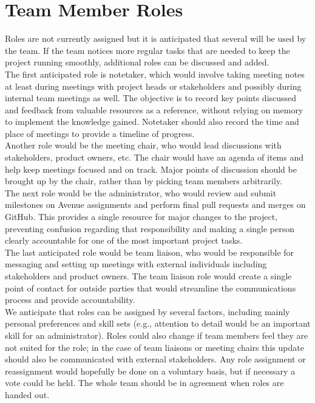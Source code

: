 \documentclass{article}
\begin{document}
\section{Team Member Roles}
Roles are not currently assigned but it is anticipated that several will be used by the team. If the team notices more regular tasks that are needed to keep the project running smoothly, additional roles can be discussed and added. \\
The first anticipated role is notetaker, which would involve taking meeting notes at least during meetings with project heads or stakeholders and possibly during internal team meetings as well. The objective is to record key points discussed and feedback from valuable resources as a reference, without relying on memory to implement the knowledge gained. Notetaker should also record the time and place of meetings to provide a timeline of progress.\\
Another role would be the meeting chair, who would lead discussions with stakeholders, product owners, etc. The chair would have an agenda of items and help keep meetings focused and on track. Major points of discussion should be brought up by the chair, rather than by picking team members arbitrarily.\\
The next role would be the administrator, who would review and submit milestones on Avenue assignments and perform final pull requests and merges on GitHub. This provides a single resource for major changes to the project, preventing confusion regarding that responsibility and making a single person clearly accountable for one of the most important project tasks.\\
The last anticipated role would be team liaison, who would be responsible for messaging and setting up meetings with external individuals including stakeholders and product owners. The team liaison role would create a single point of contact for outside parties that would streamline the communications process and provide accountability.\\
We anticipate that roles can be assigned by several factors, including mainly personal preferences and skill sets (e.g., attention to detail would be an important skill for an administrator). Roles could also change if team members feel they are not suited for the role; in the case of team liaisons or meeting chairs this update should also be communicated with external stakeholders. Any role assignment or reassignment would hopefully be done on a voluntary basis, but if necessary a vote could be held. The whole team should be in agreement when roles are handed out.
\end{document}
